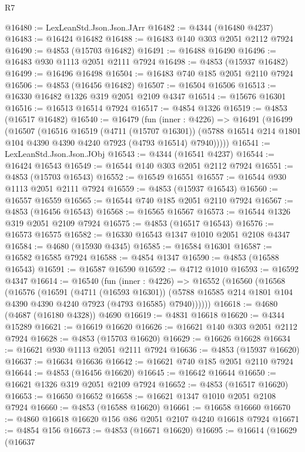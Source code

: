 \begin{lexlean}{R7}
\begin{coremodule}
@16480 := LexLeanStd.Json.Json.JArr
@16482 := @4344 (@16480 @4237)
@16483 := @16424 @16482
@16488 := @16483 @140 @303 @2051 @2112 @7924
@16490 := @4853 (@15703 @16482)
@16491 := @16488 @16490
@16496 := @16483 @930 @1113 @2051 @2111 @7924
@16498 := @4853 (@15937 @16482)
@16499 := @16496 @16498
@16504 := @16483 @740 @185 @2051 @2110 @7924
@16506 := @4853 (@16456 @16482)
@16507 := @16504 @16506
@16513 := @16330 @16482 @1326 @319 @2051 @2109 @4347
@16514 := @15676 @16301
@16516 := @16513 @16514 @7924
@16517 := @4854 @1326
@16519 := @4853 (@16517 @16482)
@16540 := @16479
    (fun (inner : @4226) =>
    @16491
      (@16499
        (@16507
          (@16516
            @16519
            (@4711 (@15707 @16301))
            (@5788 @16514 @214 @1801 @104 @4390 @4390 @4240 @7923 (@4793 @16514) @7940)))))
@16541 := LexLeanStd.Json.Json.JObj
@16543 := @4344 (@16541 @4237)
@16544 := @16424 @16543
@16549 := @16544 @140 @303 @2051 @2112 @7924
@16551 := @4853 (@15703 @16543)
@16552 := @16549 @16551
@16557 := @16544 @930 @1113 @2051 @2111 @7924
@16559 := @4853 (@15937 @16543)
@16560 := @16557 @16559
@16565 := @16544 @740 @185 @2051 @2110 @7924
@16567 := @4853 (@16456 @16543)
@16568 := @16565 @16567
@16573 := @16544 @1326 @319 @2051 @2109 @7924
@16575 := @4853 (@16517 @16543)
@16576 := @16573 @16575
@16582 := @16330 @16543 @1347 @1010 @2051 @2108 @4347
@16584 := @4680 (@15930 @4345)
@16585 := @16584 @16301
@16587 := @16582 @16585 @7924
@16588 := @4854 @1347
@16590 := @4853 (@16588 @16543)
@16591 := @16587 @16590
@16592 := @4712 @1010
@16593 := @16592 @4347
@16614 := @16540
    (fun (inner : @4226) =>
    @16552
      (@16560
        (@16568
          (@16576
            (@16591
              (@4711 (@16593 @16301))
              (@5788 @16585 @214 @1801 @104 @4390 @4390 @4240 @7923 (@4793 @16585) @7940))))))
@16618 := @4680 (@4687 (@16180 @4328)) @4690
@16619 := @4831 @16618
@16620 := @4344 @15289
@16621 := @16619 @16620
@16626 := @16621 @140 @303 @2051 @2112 @7924
@16628 := @4853 (@15703 @16620)
@16629 := @16626 @16628
@16634 := @16621 @930 @1113 @2051 @2111 @7924
@16636 := @4853 (@15937 @16620)
@16637 := @16634 @16636
@16642 := @16621 @740 @185 @2051 @2110 @7924
@16644 := @4853 (@16456 @16620)
@16645 := @16642 @16644
@16650 := @16621 @1326 @319 @2051 @2109 @7924
@16652 := @4853 (@16517 @16620)
@16653 := @16650 @16652
@16658 := @16621 @1347 @1010 @2051 @2108 @7924
@16660 := @4853 (@16588 @16620)
@16661 := @16658 @16660
@16670 := @4860 @16618 @16620 @156 @86 @2051 @2107 @4240 @16618 @7924
@16671 := @4854 @156
@16673 := @4853 (@16671 @16620)
@16695 := @16614
    (@16629
      (@16637

\end{coremodule}
\end{lexlean}
